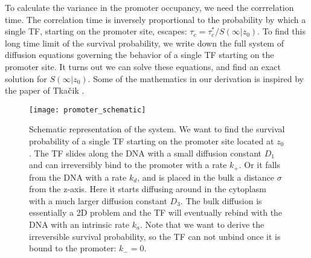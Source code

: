 To calculate the variance in the promoter occupancy, we need the corrrelation time. The correlation time is inversely proportional to the probability by which a single TF, starting on the promoter site, escapes: $\tau_c = \tau_c^* / S(\infty|z_0)$. To find this long time limit of the survival probability, we write down the full system of diffusion equations governing the behavior of a single TF starting on the promoter site. It turns out we can solve these equations, and find an exact solution for $S(\infty|z_0)$. Some of the mathematics in our derivation is inspired by the paper of Tka$\check{\rm c}$ik \cite{Tkacik2009}. 

\begin{figure}[ht]
\centering
\texttt{[image: promoter\_schematic]}
\caption{ Schematic representation of the system. We want to find the survival probability of a single TF starting on the promoter site located at $z_0$. The TF slides along the DNA with a small diffusion constant $D_1$ and can irreversibly bind to the promoter with a rate $k_+$. Or it falls from the DNA with a rate $k_d$, and is placed in the bulk a distance $\sigma$ from the z-axis. Here it starts diffusing around in the cytoplasm with a much larger diffusion constant $D_3$. The bulk diffusion is essentially a 2D problem and the TF will eventually rebind with the DNA with an intrinsic rate $k_a$. Note that we want to derive the irreversible survival probability, so the TF can not unbind once it is bound to the promoter: $k_- = 0$.}
\end{figure}

